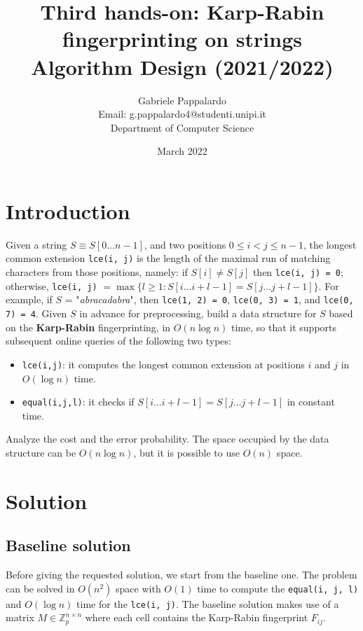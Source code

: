 \documentclass{article}
\title{Third hands-on: Karp-Rabin fingerprinting on strings \\[1ex] \large Algorithm Design (2021/2022)}
\author{Gabriele Pappalardo\\Email: g.pappalardo4@studenti.unipi.it\\Department of Computer Science}
\date{March 2022}
\begin{document}
\maketitle

\section{Introduction}

Given a string $S \equiv S[0 \dots n - 1]$, and two positions $0 \le i < j \le n - 1$, the longest common extension \verb+lce(i, j)+ is the length of the maximal run of matching characters from those positions, namely: if $S[i] \ne S[j]$ then \verb+lce(i, j) = 0+; otherwise, \verb+lce(i, j)+ $= \max \{l \ge 1 : S[i \dots i + l - 1] = S[j \dots j + l - 1]\}$. For example, if $S$ = "\textit{abracadabra}", then \verb+lce(1, 2) = 0+, \verb+lce(0, 3) = 1+, and \verb+lce(0, 7) = 4+. Given $S$ in advance for preprocessing, build a data structure for $S$ based on the \textbf{Karp-Rabin} fingerprinting, in $O(n \log n)$ time, so that it supports subsequent online queries of the following two types: 

\begin{itemize}
    \item \verb+lce(i,j)+: it computes the longest common extension at positions $i$ and $j$ in $O(\log n)$ time. 
    \item \verb+equal(i,j,l)+: it checks if $S[i \dots i+l - 1]=S[j \dots j+l - 1]$ in constant time. 
\end{itemize}

\noindent Analyze the cost and the error probability. The space occupied by the data structure can be $O(n \log n)$, but it is possible to use $O(n)$ space.  

\section{Solution}

\subsection{Baseline solution}

Before giving the requested solution, we start from the baseline one. The problem can be solved in $O(n^2)$ space with $O(1)$ time to compute the \verb+equal(i, j, l)+ and $O(\log n)$ time for the \verb+lce(i, j)+. The baseline solution makes use of a matrix $M \in \mathbb{Z}_p^{n \times n}$ where each cell contains the Karp-Rabin fingerprint $F_{ij}$.
\end{document}
